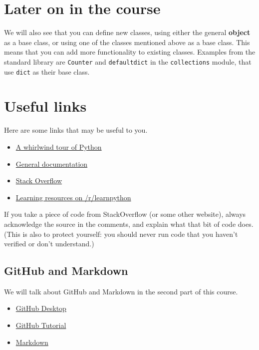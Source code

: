 \documentclass[12pt]{book}
\begin{document}
\section{Later on in the course}
We will also see that you can define new classes, using either the general \textbf{object} as a base class, or using one of the classes mentioned above as a base class. This means that you can add more functionality to existing classes. Examples from the standard library are \texttt{Counter} and \texttt{defaultdict} in the \texttt{collections} module, that use \texttt{dict} as their base class.

\section{Useful links}
Here are some links that may be useful to you.

\begin{itemize}
\item \href{http://www.oreilly.com/programming/free/files/a-whirlwind-tour-of-python.pdf}{A
  whirlwind tour of Python}
\item \href{https://docs.python.org/3.5/index.html}{General documentation}
\item \href{http://stackoverflow.com/}{Stack Overflow}
\item \href{https://www.reddit.com/r/learnpython/wiki/index}{Learning resources on /r/learnpython}
\end{itemize}

If you take a piece of code from StackOverflow (or some other website), always acknowledge the source in the comments, and explain what that bit of code does.
(This is also to protect yourself: you should never run code that you haven't verified or don't understand.)

\subsection{GitHub and Markdown}
We will talk about GitHub and Markdown in the second part of this course.
\begin{itemize}
\item \href{https://help.github.com/desktop/guides/getting-started/}{GitHub Desktop}
\item \href{http://readwrite.com/2013/09/30/understanding-github-a-journey-for-beginners-part-1/}{GitHub Tutorial}
\item \href{https://github.com/adam-p/markdown-here/wiki/Markdown-Cheatsheet}{Markdown}
\end{itemize}
\end{document}
